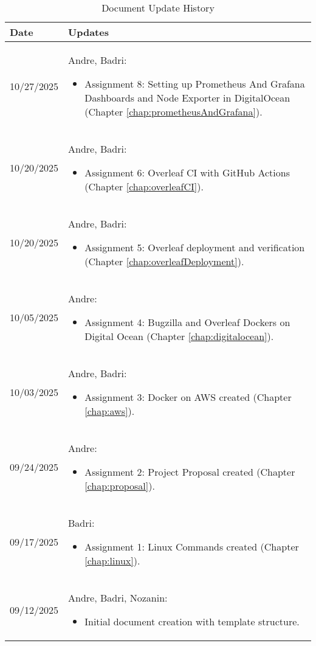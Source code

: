 \begin{longtable}{|l||p{13.5cm}|}
\caption{Document Update History \label{Table::UpdateHistory}}\\
\hline
\textbf{Date} & \textbf{Updates} \\
\hline 
\endhead
10/27/2025 & Andre, Badri:
\begin{itemize}[topsep=0pt,itemsep=0pt,parsep=0pt,partopsep=0pt,leftmargin=12pt]
\item Assignment 8: Setting up Prometheus And Grafana Dashboards and Node Exporter in DigitalOcean (Chapter \ref{chap:prometheusAndGrafana}).
\end{itemize}
\\ \hline
10/20/2025 & Andre, Badri:
\begin{itemize}[topsep=0pt,itemsep=0pt,parsep=0pt,partopsep=0pt,leftmargin=12pt]
\item Assignment 6: Overleaf CI with GitHub Actions (Chapter \ref{chap:overleafCI}).
\end{itemize}
\\ \hline
10/20/2025 & Andre, Badri:
\begin{itemize}[topsep=0pt,itemsep=0pt,parsep=0pt,partopsep=0pt,leftmargin=12pt]
\item Assignment 5: Overleaf deployment and verification (Chapter \ref{chap:overleafDeployment}).
\end{itemize}
\\ \hline
10/05/2025 & Andre:
\begin{itemize}[topsep=0pt,itemsep=0pt,parsep=0pt,partopsep=0pt,leftmargin=12pt]
\item Assignment 4: Bugzilla and Overleaf Dockers on Digital Ocean (Chapter \ref{chap:digitalocean}).
\end{itemize} 
\\ \hline
10/03/2025 & Andre, Badri:
\begin{itemize}[topsep=0pt,itemsep=0pt,parsep=0pt,partopsep=0pt,leftmargin=12pt]
\item Assignment 3: Docker on AWS created (Chapter \ref{chap:aws}).
\end{itemize} 
\\ \hline
09/24/2025 & Andre:
\begin{itemize}[topsep=0pt,itemsep=0pt,parsep=0pt,partopsep=0pt,leftmargin=12pt]
\item Assignment 2: Project Proposal created (Chapter \ref{chap:proposal}).
\end{itemize} 
\\ \hline
09/17/2025 & Badri:
\begin{itemize}[topsep=0pt,itemsep=0pt,parsep=0pt,partopsep=0pt,leftmargin=12pt]
\item Assignment 1: Linux Commands created (Chapter \ref{chap:linux}).
\end{itemize} 
\\ \hline
09/12/2025 & Andre, Badri, Nozanin:
\begin{itemize}[topsep=0pt,itemsep=0pt,parsep=0pt,partopsep=0pt,leftmargin=12pt]
\item Initial document creation with template structure.
\end{itemize}
\\ \hline
\end{longtable}